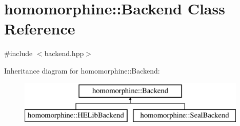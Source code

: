 \hypertarget{classhomomorphine_1_1_backend}{}\section{homomorphine\+::Backend Class Reference}
\label{classhomomorphine_1_1_backend}


{\ttfamily \#include $<$backend.\+hpp$>$}

Inheritance diagram for homomorphine\+::Backend\+:\begin{figure}[H]
\begin{center}
\leavevmode
\includegraphics[height=2.000000cm]{classhomomorphine_1_1_backend}
\end{center}
\end{figure}
